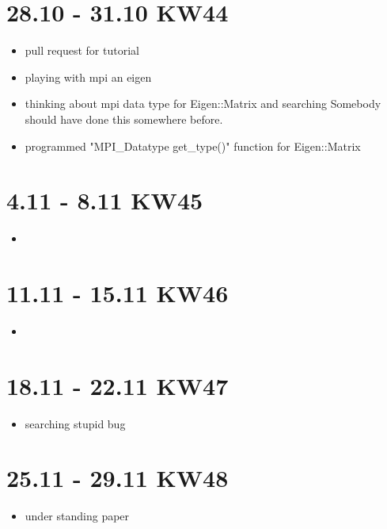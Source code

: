 \section{28.10 - 31.10 KW44}

\begin{itemize}
	\item pull request for tutorial
	\item playing with mpi an eigen
	\item thinking about mpi data type for Eigen::Matrix and searching Somebody should have done this somewhere before.
	\item programmed "MPI\_Datatype get\_type()" function for Eigen::Matrix 
\end{itemize}

\section{4.11 - 8.11 KW45}
\begin{itemize}
	\item 
\end{itemize}

\section{11.11 - 15.11 KW46}
\begin{itemize}
	\item 
\end{itemize}

\section{18.11 - 22.11 KW47}
\begin{itemize}
	\item searching stupid bug 
\end{itemize}

\section{25.11 - 29.11 KW48}
\begin{itemize}
	\item under standing paper
\end{itemize}




